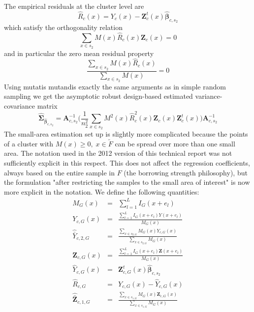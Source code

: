 \documentclass[a4paper,12pt,leqno, titlepage]{article}
\begin{document}
 The empirical residuals at the cluster level are
 $$\hat{R}_{c}(x)=Y_c(x)-\pmb{Z}^t_c(x)\hat{\pmb{\beta}}_{c,s_2}$$
 which satisfy the orthogonality relation
 $$\sum_{x\in{s_2}}M(x)\hat{R}_c(x)\pmb{Z}_c(x)=0$$
 and in particular the zero mean residual property
$$\frac{\sum_{x\in{s_2}}M(x)\hat{R}_c(x)}{\sum_{x\in{s_2}}M(x)}=0$$
Using mutatis mutandis exactly the same arguments as in simple random sampling we get the asymptotic robust design-based estimated variance-covariance matrix
\begin{equation}\label{estvarcluster1}
\hat{\pmb{\Sigma}}_{\hat{\pmb{\beta}}_{c,s_2}}=\pmb{A}^{-1}_{c,s_2}\Big(\frac{1}{n^2_2}\sum_{x\in{s_2}}M^2(x)\hat{R}^2_c(x)
\pmb{Z}_c(x)\pmb{Z}^t_c(x)\Big)\pmb{A}^{-1}_{c,s_2}
\end{equation}
The small-area estimation set up is slightly more complicated because the points of a cluster with $M(x) \ge 0, \;x\in{\tilde{F}}$ can be spread over more than one small area. The notation used in the 2012 version of this technical report was not sufficiently explicit in this respect. This does not affect the regression coefficients, always based on the entire sample in $F$ (the borrowing strength philosophy), but the formulation "after restricting the samples to the small area of interest" is now more explicit in the notation. We define the following quantities:
\begin{eqnarray} \label{extranotation}
M_G(x) &=& \sum_{l=1}^L  I_G(x+e_l) \nonumber \\
Y_{c,G}(x)&=&\frac{\sum_{l=1}^L I_G(x+e_l)Y(x+e_l)}{M_G(x)} \nonumber \\
\hat{\bar{Y}}_{c,2,G} &=& \frac{\sum_{x\in{s_{2,G}}}M_G(x)Y_{c,G}(x)}{\sum_{x\in{s_{2,G}}}M_G(x)}\nonumber \\
\pmb{Z}_{c,G}(x)&=& \frac{\sum_{l=1}^L I_G(x+e_l)\pmb{Z}(x+e_l)}{M_G(x)} \nonumber \\
\hat{Y}_{c,G}(x)&=&\pmb{Z}^t_{c,G}(x)\hat{\pmb{\beta}}_{c,s_2} \nonumber \\
\hat{R}_{c,G}&=& Y_{c,G}(x)-\hat{Y}_{c,G}(x) \nonumber \\
\hat{\bar{\pmb{Z}}}_{c,1,G}&=&\frac{\sum_{x\in{s_{1,G}}}M_G(x)\pmb{Z}_{c,G}(x)}{\sum_{x\in{s_{1,G}}}M_G(x)}
\end{eqnarray}
\end{document}

